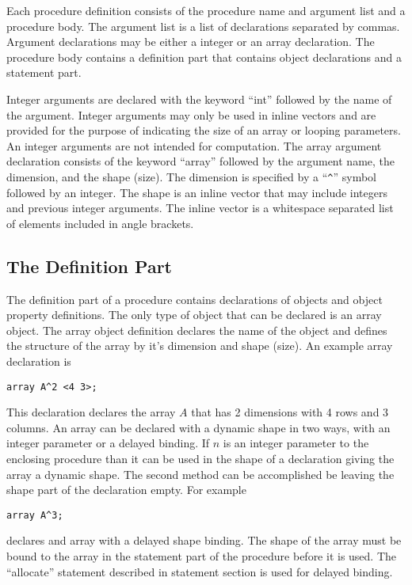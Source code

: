 Each procedure
definition consists of the procedure name and argument list and a procedure
body.  The argument list is a list of declarations separated by commas.
Argument declarations may be either a integer or an array declaration.
The procedure body contains a definition part that contains object declarations
and a statement part.

Integer arguments are declared with the keyword ``int'' followed by the
name of the argument.  Integer arguments may only be used in inline vectors
and are provided for the purpose of indicating the size of an array or 
looping parameters.  An integer arguments are not intended for computation.
The array argument declaration consists of the keyword ``array'' followed by
the argument name, the dimension, and the shape (size).  The dimension is
specified by a ``\verb+^+'' symbol followed by an integer.  The shape is an 
inline vector that may include integers and previous integer arguments.  The 
inline vector is a whitespace separated list of elements included in angle 
brackets.


\subsection{The Definition Part}
The definition part of a procedure contains declarations of objects and 
object property definitions.  The only type of object that can be declared
is an array object.  The array object definition declares the name of the 
object and defines the structure of the array by it's dimension and shape 
(size).  An example array declaration is
\begin{verbatim}
array A^2 <4 3>;
\end{verbatim}
This declaration declares the array $A$ that has 2 dimensions with 4 rows and
3 columns.  An array can be declared with a dynamic shape in two ways, with
an integer parameter or a delayed binding.  If $n$ is an integer parameter
to the enclosing procedure than it can be used in the shape of a declaration
giving the array a dynamic shape.  The second method can be accomplished be
leaving the shape part of the declaration empty.  For example
\begin{verbatim}
array A^3;
\end{verbatim}
declares and array with a delayed shape binding.  The shape of the array
must be bound to the array in the statement part of the procedure before
it is used.  The ``allocate'' statement described in statement section is
used for delayed binding.


